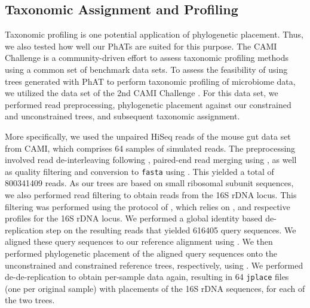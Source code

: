 \subsection{Taxonomic Assignment and Profiling}
\label{ch:AutomaticTrees:sec:Evaluation:sub:TaxonomicAssignmentProfilingDetails}

Taxonomic profiling is one potential application of phylogenetic placement.
Thus, we also tested how well our \acp{PhAT} are suited for this purpose.
The CAMI Challenge \citep{Sczyrba2017} is a community-driven effort to assess taxonomic profiling methods
using a common set of benchmark data sets.
To assess the feasibility of using trees generated with \ac{PhAT} to perform taxonomic profiling of microbiome data,
we utilized the  data set of the 2nd CAMI Challenge \citep{Bremges2018}.
For this data set, we performed read preprocessing, phylogenetic placement
against our constrained and unconstrained  trees,
and subsequent taxonomic assignment.

More specifically, we used the unpaired HiSeq reads of the mouse gut data set from CAMI,
which comprises \num{64} samples of simulated reads.
The preprocessing involved read de-interleaving following \cite{DeinterleaveFastq},
paired-end read merging using  \citep{Zhang2014},
as well as quality filtering and conversion to \texttt{fasta} using  \citep{Rognes2016}.
This yielded a total of \num{800 341 409} reads.
As our trees are based on small ribosomal subunit sequences,
we also performed read filtering to obtain reads from the 16S rDNA locus.
This filtering was performed using the protocol of \cite{Logares2014},
which relies on  \citep{Eddy1998,Eddy2009}, and respective profiles for the 16S rDNA locus.
We performed a global identity based de-replication step on the resulting reads that yielded \num{616 405} query sequences.
We aligned these query sequences to our  reference alignment
using  \citep{Berger2011a,Berger2012}.
We then performed phylogenetic placement of the aligned query sequences onto the unconstrained and constrained reference trees,
respectively, using  \citep{Barbera2018}.
We performed de-de-replication to obtain per-sample data again, %
resulting in \num{64} \texttt{jplace} files (one per original sample) with placements of the 16S rDNA sequences,
for each of the two trees.

